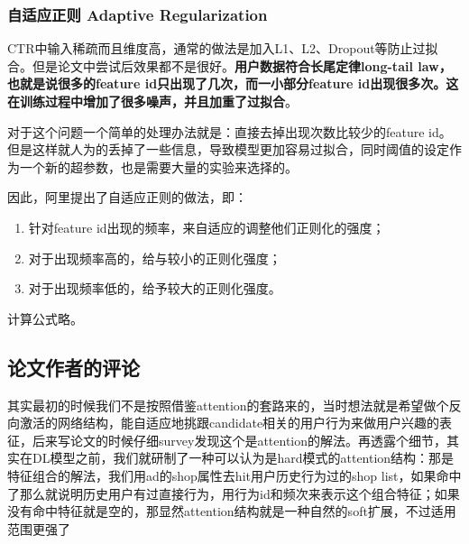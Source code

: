 \documentclass[12pt]{article}
\begin{document}
\subsubsection{自适应正则 Adaptive Regularization}
CTR中输入稀疏而且维度高，通常的做法是加入L1、L2、Dropout等防止过拟合。但是论文中尝试后效果都不是很好。\textbf{用户数据符合长尾定律long-tail law，也就是说很多的feature id只出现了几次，而一小部分feature id出现很多次。这在训练过程中增加了很多噪声，并且加重了过拟合}。

对于这个问题一个简单的处理办法就是：直接去掉出现次数比较少的feature id。但是这样就人为的丢掉了一些信息，导致模型更加容易过拟合，同时阈值的设定作为一个新的超参数，也是需要大量的实验来选择的。

因此，阿里提出了自适应正则的做法，即：
\begin{enumerate}
\setlength{\itemsep}{0pt}
\setlength{\parsep}{0pt}
\setlength{\parskip}{0pt}
    \item 针对feature id出现的频率，来自适应的调整他们正则化的强度；
    \item 对于出现频率高的，给与较小的正则化强度；
    \item 对于出现频率低的，给予较大的正则化强度。
\end{enumerate}

计算公式略。

\subsection{论文作者的评论}
其实最初的时候我们不是按照借鉴attention的套路来的，当时想法就是希望做个反向激活的网络结构，能自适应地挑跟candidate相关的用户行为来做用户兴趣的表征，后来写论文的时候仔细survey发现这个是attention的解法。再透露个细节，其实在DL模型之前，我们就研制了一种可以认为是hard模式的attention结构：那是特征组合的解法，我们用ad的shop属性去hit用户历史行为过的shop list，如果命中了那么就说明历史用户有过直接行为，用行为id和频次来表示这个组合特征；如果没有命中特征就是空的，那显然attention结构就是一种自然的soft扩展，不过适用范围更强了



\end{document}
